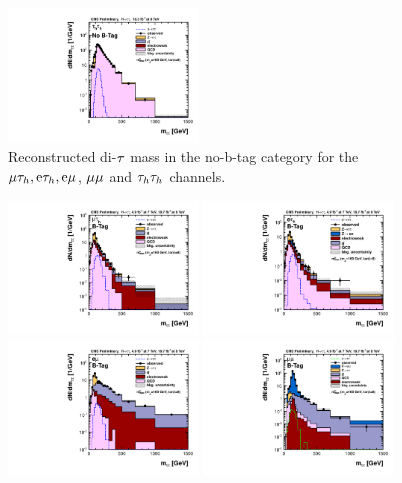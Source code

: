 \begin{figure}[!h]
\begin{center}
 \includegraphics[width=0.45\textwidth]{MSSM/PLOTS/tauTau_nobtag_postfit_8TeV_LOG.pdf}
 \caption{Reconstructed di-$\mathrm{\tau}$ mass in the no-b-tag category for the $\mathrm{\mu}\mathrm{\tau}_{h}, \mathrm{e}\mathrm{\tau}_{h}, \mathrm{e}\mathrm{\mu}$, $\mathrm{\mu}\mathrm{\mu}$ and $\mathrm{\tau}_{h}\mathrm{\tau}_{h}$ channels.}
  \label{fig:mass_no_b_tag}\end{center}\end{figure}


\begin{figure}[!h]\begin{center}
 \includegraphics[width=0.45\textwidth]{MSSM/PLOTS/muTau_btag_postfit_7+8TeV_LOG.pdf}
 \includegraphics[width=0.45\textwidth]{MSSM/PLOTS/eleTau_btag_postfit_7+8TeV_LOG.pdf}
 \includegraphics[width=0.45\textwidth]{MSSM/PLOTS/emu_btag_postfit_7+8TeV_LOG.pdf}
 \includegraphics[width=0.45\textwidth]{MSSM/PLOTS/mumu_btag_postfit_7+8TeV_LOG.pdf}

\end{center}
\end{figure}
